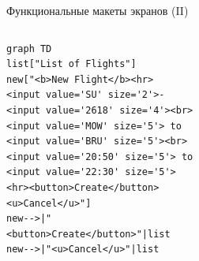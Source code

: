 \documentclass[aspectratio=169,handout,bigger]{beamer}
\begin{document}
\begin{frame}[fragile]{Функциональные макеты экранов (II)}
  \begin{columns}
    \begin{column}{.6\textwidth}
\begin{verbatim}
graph TD
list["List of Flights"]
new["<b>New Flight</b><hr>
<input value='SU' size='2'>-
<input value='2618' size='4'><br>
<input value='MOW' size='5'> to
<input value='BRU' size='5'><br>
<input value='20:50' size='5'> to
<input value='22:30' size='5'>
<hr><button>Create</button>
<u>Cancel</u>"]
new-->|"
<button>Create</button>"|list
new-->|"<u>Cancel</u>"|list
\end{verbatim}
    \end{column}
    \begin{column}{.3\textwidth}
    \end{column}
  \end{columns}
\end{frame}
\end{document}
